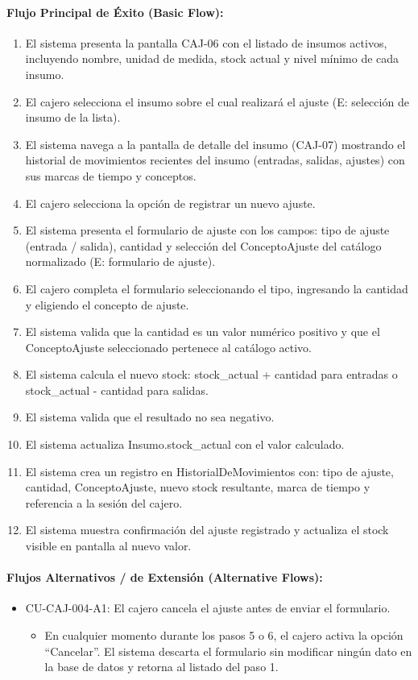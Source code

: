 \paragraph{Flujo Principal de Éxito (Basic Flow):}
\begin{enumerate}
    \item[I.] El sistema presenta la pantalla CAJ-06 con el listado de insumos activos, incluyendo nombre, unidad de medida, stock actual y nivel mínimo de cada insumo.
    \item[II.] El cajero selecciona el insumo sobre el cual realizará el ajuste (E: selección de insumo de la lista).
    \item[III.] El sistema navega a la pantalla de detalle del insumo (CAJ-07) mostrando el historial de movimientos recientes del insumo (entradas, salidas, ajustes) con sus marcas de tiempo y conceptos.
    \item[IV.] El cajero selecciona la opción de registrar un nuevo ajuste.
    \item[V.] El sistema presenta el formulario de ajuste con los campos: tipo de ajuste (entrada / salida), cantidad y selección del ConceptoAjuste del catálogo normalizado (E: formulario de ajuste).
    \item[VI.] El cajero completa el formulario seleccionando el tipo, ingresando la cantidad y eligiendo el concepto de ajuste.
    \item[VII.] El sistema valida que la cantidad es un valor numérico positivo y que el ConceptoAjuste seleccionado pertenece al catálogo activo.
    \item[VIII.] El sistema calcula el nuevo stock: stock\_actual + cantidad para entradas o stock\_actual - cantidad para salidas.
    \item[IX.] El sistema valida que el resultado no sea negativo.
    \item[X.] El sistema actualiza Insumo.stock\_actual con el valor calculado.
    \item[XI.] El sistema crea un registro en HistorialDeMovimientos con: tipo de ajuste, cantidad, ConceptoAjuste, nuevo stock resultante, marca de tiempo y referencia a la sesión del cajero.
    \item[XII.] El sistema muestra confirmación del ajuste registrado y actualiza el stock visible en pantalla al nuevo valor.
\end{enumerate}

\paragraph{Flujos Alternativos / de Extensión (Alternative Flows):}
\begin{itemize}
    \item CU-CAJ-004-A1: El cajero cancela el ajuste antes de enviar el formulario.
    \begin{itemize}
        \item En cualquier momento durante los pasos 5 o 6, el cajero activa la opción ``Cancelar''. El sistema descarta el formulario sin modificar ningún dato en la base de datos y retorna al listado del paso 1.
    \end{itemize}
\end{itemize}


